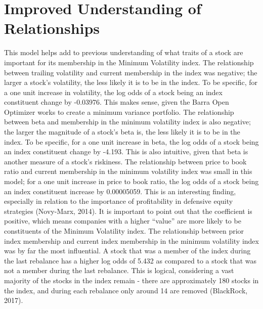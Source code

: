 \documentclass[12pt,twoside]{reedthesis}
\theoremstyle{definition}
\theoremstyle{definition}
\theoremstyle{definition}
\theoremstyle{remark}
\begin{document}
\section{Improved Understanding of
Relationships}\label{improved-understanding-of-relationships}

This model helps add to previous understanding of what traits of a stock
are important for its membership in the Minimum Volatility index. The
relationship between trailing volatility and current membership in the
index was negative; the larger a stock's volatility, the less likely it
is to be in the index. To be specific, for a one unit increase in
volatility, the log odds of a stock being an index constituent change by
-0.03976. This makes sense, given the Barra Open Optimizer works to
create a minimum variance portfolio. The relationship between beta and
membership in the minimum volatility index is also negative; the larger
the magnitude of a stock's beta is, the less likely it is to be in the
index. To be specific, for a one unit increase in beta, the log odds of
a stock being an index constituent change by -4.193. This is also
intuitive, given that beta is another measure of a stock's riskiness.
The relationship between price to book ratio and current membership in
the minimum volatility index was small in this model; for a one unit
increase in price to book ratio, the log odds of a stock being an index
constituent increase by 0.00005059. This is an interesting finding,
especially in relation to the importance of profitability in defensive
equity strategies (Novy-Marx, 2014). It is important to point out that
the coefficient is positive, which means companies with a higher
``value'' are more likely to be constituents of the Minimum Volatility
index. The relationship between prior index membership and current index
membership in the minimum volatility index was by far the most
influential. A stock that was a member of the index during the last
rebalance has a higher log odds of 5.432 as compared to a stock that was
not a member during the last rebalance. This is logical, considering a
vast majority of the stocks in the index remain - there are
approximately 180 stocks in the index, and during each rebalance only
around 14 are removed (BlackRock, 2017).
\end{document}
